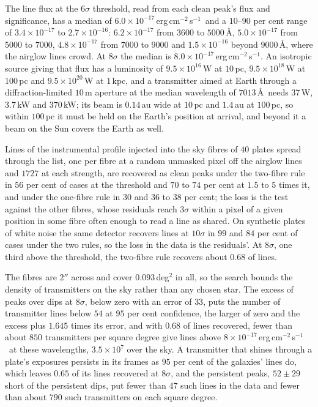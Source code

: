 \documentclass[3p,11pt]{elsarticle}
\newcommand{\flux}{erg\,cm$^{-2}$\,s$^{-1}$}
\begin{document}
The line flux at the $6\sigma$ threshold, read from each clean peak's flux and
significance, has a median of $6.0\times10^{-17}$\,\flux\ and a $10$--$90$ per cent
range of $3.4\times10^{-17}$ to $2.7\times10^{-16}$: $6.2\times10^{-17}$ from $3600$ to
$5000$\,\AA, $5.0\times10^{-17}$ from $5000$ to $7000$, $4.8\times10^{-17}$ from $7000$
to $9000$ and $1.5\times10^{-16}$ beyond $9000$\,\AA, where the airglow lines crowd. At
$8\sigma$ the median is $8.0\times10^{-17}$\,\flux. An isotropic source giving that flux
has a luminosity of $9.5\times10^{16}$\,W at $10$\,pc, $9.5\times10^{18}$\,W at
$100$\,pc and $9.5\times10^{20}$\,W at $1$\,kpc, and a transmitter aimed at Earth through
a diffraction-limited $10$\,m aperture at the median wavelength of $7013$\,\AA\ needs
$37$\,W, $3.7$\,kW and $370$\,kW; its beam is $0.14$\,au wide at $10$\,pc and $1.4$\,au
at $100$\,pc, so within $100$\,pc it must be held on the Earth's position at arrival,
and beyond it a beam on the Sun covers the Earth as well.

Lines of the instrumental profile injected into the sky fibres of $40$ plates spread
through the list, one per fibre at a random unmasked pixel off the airglow lines and
$1727$ at each strength, are recovered as clean peaks under the two-fibre rule in $56$
per cent of cases at the threshold and $70$ to $74$ per cent at $1.5$ to $5$ times it,
and under the one-fibre rule in $30$ and $36$ to $38$ per cent; the loss is the test
against the other fibres, whose residuals reach $3\sigma$ within a pixel of a given
position in some fibre often enough to read a line as shared. On synthetic plates of
white noise the same detector recovers lines at $10\sigma$ in $99$ and $84$ per cent of
cases under the two rules, so the loss in the data is the residuals'. At $8\sigma$, one
third above the threshold, the two-fibre rule recovers about $0.68$ of lines.

The fibres are $2''$ across and cover $0.093$\,deg$^2$ in all, so the search bounds the
density of transmitters on the sky rather than any chosen star. The excess of peaks over
dips at $8\sigma$, below zero with an error of $33$, puts the number of transmitter lines
below $54$ at $95$ per cent confidence, the larger of zero and the excess plus $1.645$
times its error, and with $0.68$ of lines recovered, fewer than about $850$ transmitters
per square degree give lines above $8\times10^{-17}$\,\flux\ at these wavelengths,
$3.5\times10^{7}$ over the sky. A transmitter that shines through a plate's exposures
persists in its frames as $95$ per cent of the galaxies' lines do, which leaves $0.65$ of
its lines recovered at $8\sigma$, and the persistent peaks, $52\pm29$ short of the
persistent dips, put fewer than $47$ such lines in the data and fewer than about $790$
such transmitters on each square degree.
\end{document}
